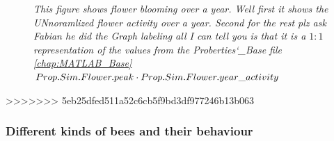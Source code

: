 		
		\begin{figure}
			\centering
			\caption{\textit{This figure shows flower blooming over a year. Well first it shows the UNnoramlized flower activity over a year. Second for the rest plz ask Fabian he did the Graph labeling all I can tell you is that it is a $1:1$ representation of the values from the Proberties\char`_Base file \ref{chap:MATLAB_Base}~$Prop.Sim.Flower.peak \cdot Prop.Sim.Flower.year\char`_activity$ }}
			\label{fig:seasonalFlowers}
		\end{figure}
>>>>>>> 5eb25dfed511a52c6cb5f9bd3df977246b13b063
	
		\subsubsection{Different kinds of bees and their behaviour}
			
		
%	 
	
